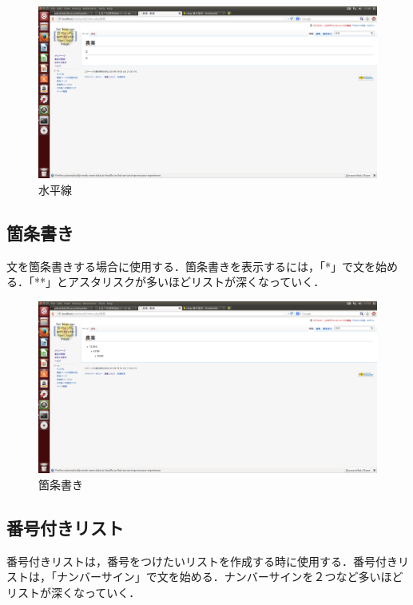 \begin{figure}[htb]
\centering
\includegraphics[width=14cm]{suihei}
\caption{水平線}\label{図}
\end{figure}

\subsection{箇条書き}
文を箇条書きする場合に使用する．箇条書きを表示するには，「*」で文を始める．「**」とアスタリスクが多いほどリストが深くなっていく．

\begin{figure}[htb]
\centering
\includegraphics[width=14cm]{kazyou}
\caption{箇条書き}\label{図}
\end{figure}

\subsection{番号付きリスト}

番号付きリストは，番号をつけたいリストを作成する時に使用する．番号付きリストは，「ナンバーサイン」で文を始める．ナンバーサインを２つなど多いほどリストが深くなっていく．

